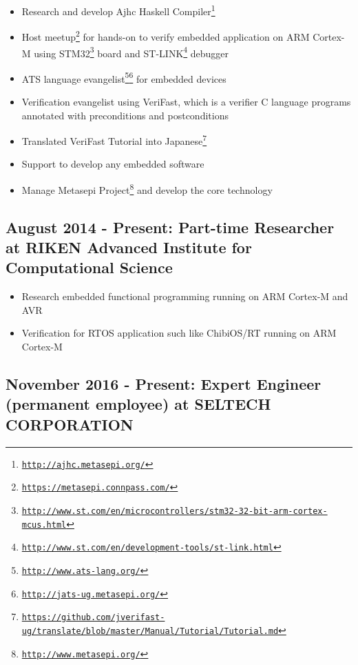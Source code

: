 \documentclass[letterpaper]{article}
\begin{document}
\begin{itemize}
  \item Research and develop Ajhc Haskell Compiler\footnote{\href{http://ajhc.metasepi.org/}{\tt http://ajhc.metasepi.org/}}
  \item Host meetup\footnote{\href{https://metasepi.connpass.com/}{\tt https://metasepi.connpass.com/}} for hands-on to verify embedded application on ARM Cortex-M using STM32\footnote{\href{http://www.st.com/en/microcontrollers/stm32-32-bit-arm-cortex-mcus.html}{\tt http://www.st.com/en/microcontrollers/stm32-32-bit-arm-cortex-mcus.html}} board and ST-LINK\footnote{\href{http://www.st.com/en/development-tools/st-link.html}{\tt http://www.st.com/en/development-tools/st-link.html}} debugger
  \item ATS language evangelist\footnote{\href{http://www.ats-lang.org/}{\tt http://www.ats-lang.org/}}\footnote{\href{http://jats-ug.metasepi.org/}{\tt http://jats-ug.metasepi.org/}} for embedded devices
  \item Verification evangelist using VeriFast, which is a verifier C language programs annotated with preconditions and postconditions
  \item Translated VeriFast Tutorial into Japanese\footnote{\href{https://github.com/jverifast-ug/translate/blob/master/Manual/Tutorial/Tutorial.md}{\tt https://github.com/jverifast-ug/translate/blob/master/Manual/Tutorial/Tutorial.md}}
  \item Support to develop any embedded software
  \item Manage Metasepi Project\footnote{\href{http://www.metasepi.org/}{\tt http://www.metasepi.org/}} and develop the core technology
\end{itemize}

\subsection*{August 2014 - Present: Part-time Researcher at RIKEN Advanced Institute for Computational Science}

\begin{itemize}
  \item Research embedded functional programming running on ARM Cortex-M and AVR
  \item Verification for RTOS application such like ChibiOS/RT running on ARM Cortex-M
\end{itemize}

\subsection*{November 2016 - Present: Expert Engineer (permanent employee) at SELTECH CORPORATION}
\end{document}
